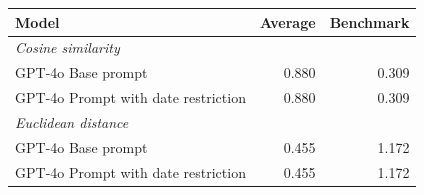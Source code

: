 
\begin{tabular}{lrr}
\toprule
Model & Average & Benchmark\\
\midrule
\multicolumn{3}{l}{\textit{Cosine similarity}}\\
\hspace{1em}GPT-4o Base prompt & 0.880 & 0.309\\
\hspace{1em}GPT-4o Prompt with date restriction & 0.880 & 0.309\\
\midrule
\multicolumn{3}{l}{\textit{Euclidean distance}}\\
\hspace{1em}GPT-4o Base prompt & 0.455 & 1.172\\
\hspace{1em}GPT-4o Prompt with date restriction & 0.455 & 1.172\\
\bottomrule
\end{tabular}
